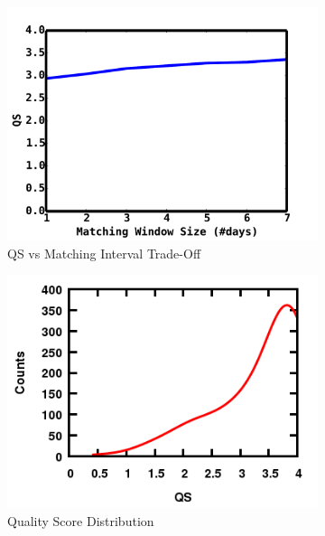 \documentclass[letterpaper]{article}
\begin{document}
\begin{figure}
\begin{subfigure}{.70\columnwidth}
    \centering
  \includegraphics[scale=0.2]{matchingwindow}
  \vspace{-0.5em}
  \caption{\scriptsize QS vs Matching Interval Trade-Off}
  \label{fig:matchinginterval}
\end{subfigure}\hspace{.5pt}
\begin{subfigure}{.70\columnwidth}
    \centering
  \includegraphics[scale=0.33]{doubleHump}
  \vspace{-1em}
  \caption{\scriptsize Quality Score Distribution}
  \label{fig:doubleHump}
\end{subfigure}\hspace{.5pt}
\begin{subfigure}{.70\columnwidth}
    \centering

\end{subfigure}
\end{figure}
\end{document}
